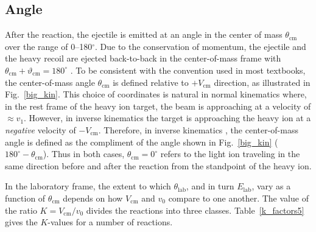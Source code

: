 \subsection{Angle}
After the reaction, the ejectile is emitted at an angle in the center of mass $\theta_\mathrm{cm}$ over the range of 0--180$^\circ$.  Due to the conservation of momentum, the ejectile and the heavy recoil are ejected back-to-back in the center-of-mass frame with $\theta_\mathrm{cm}+\vartheta_\mathrm{cm}=180^\circ$%
.  To be consistent with the convention used in most textbooks, the center-of-mass angle $\theta_\mathrm{cm}$ is defined relative to $+V_\textrm{cm}$ direction, as illustrated in Fig.~\ref{big_kin}.  This choice of coordinates is natural in normal kinematics where, in the rest frame of the heavy ion target, the beam is approaching at a velocity of $\approx v_1$.  However, in inverse kinematics %
the target is approaching the heavy ion at a \textit{negative} velocity of $-V_\mathrm{cm}$.  Therefore, in inverse kinematics%
, the center-of-mass angle is defined as the compliment of the angle shown in Fig.~\ref{big_kin} ($180^\circ-\theta_\mathrm{cm}$).  Thus in both cases, $\theta_\textrm{cm}=0^\circ$ refers to the light ion traveling in the same direction before and after the reaction from the standpoint of the heavy ion.

In the laboratory frame, the extent to which $\theta_\mathrm{lab}$, and in turn $E_\mathrm{lab}$, vary as a function of $\theta_\textrm{cm}$ depends on how $V_\mathrm{cm}$ and $v_0$ compare to one another.  The value of the ratio $K=V_\mathrm{cm}/v_0$ divides the reactions into three classes.  Table~\ref{k_factors5} gives the $K$-values for a number of reactions.

